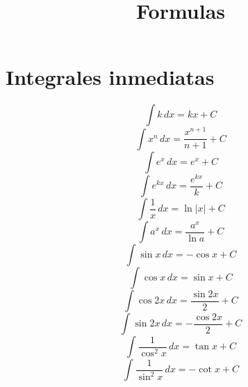 \documentclass[a4paper,12pt,numbers=noenddot]{scrreprt}
\begin{document}

\title{Formulas}

\section*{Integrales inmediatas}
    \begin{multicols}{2} %
        \begin{equation*}
            \int k \, dx = kx + C
        \end{equation*}
        \begin{equation*}
            \int x^n \, dx = \frac{x^{n+1}}{n+1} + C
        \end{equation*}
        \begin{equation*}
            \int e^x \, dx = e^x + C
        \end{equation*}
        \begin{equation*}
            \int e^{kx} \, dx = \frac{e^{kx}}{k} + C
        \end{equation*}
        \begin{equation*}
            \int \frac{1}{x} \, dx = \ln |x| + C
        \end{equation*}
        \begin{equation*}
            \int a^x \, dx = \frac{a^x}{\ln a} + C
        \end{equation*}
        \begin{equation*}   
            \int \sin x \, dx = -\cos x + C
        \end{equation*}
        \begin{equation*}
            \int \cos x \, dx = \sin x + C
        \end{equation*}
        \begin{equation*}
            \int \cos 2x \, dx = \frac{\sin 2x}{2}  + C
        \end{equation*}
        \begin{equation*}
            \int \sin 2x \, dx = -\frac{\cos 2x}{2} + C 
        \end{equation*}
        \begin{equation*}
            \int \frac{1}{\cos^2 x} \, dx = \tan x + C
        \end{equation*}
        \begin{equation*}
            \int \frac{1}{\sin^2 x} \, dx = -\cot x + C

\end{equation*}
\end{multicols}
\end{document}
